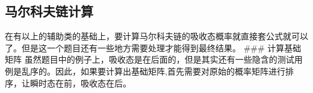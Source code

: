 \documentclass[12pt]{article}
\begin{document}
\subsection{马尔科夫链计算}\label{ux9a6cux5c14ux79d1ux592bux94feux8ba1ux7b97}

在有以上的辅助类的基础上，要计算马尔科夫链的吸收态概率就直接套公式就可以了。但是这一个题目还有一些地方需要处理才能得到最终结果。 \#\#\# 计算基础矩阵 虽然题目中的例子上，吸收态是在后面的，但是其实还有一些隐含的测试用例是乱序的。因此，如果要计算出基础矩阵,首先需要对原始的概率矩阵进行排序，让瞬时态在前，吸收态在后。

\begin{Shaded}
\begin{Highlighting}[]
  \OperatorTok{[]} \OperatorTok{(}\OperatorTok{[][]}\OperatorTok{)} \OperatorTok{\{}
    \OperatorTok{=}\OperatorTok{,}\OperatorTok{=} \OperatorTok{;}

    \OperatorTok{\textless{}}\OperatorTok{\textgreater{}}\OperatorTok{=}  \OperatorTok{\textless{}\textgreater{}();}
     \OperatorTok{(}\OperatorTok{=} \OperatorTok{;}\OperatorTok{\textless{}}\OperatorTok{;}\OperatorTok{++)} \OperatorTok{\{}
         \OperatorTok{(}\OperatorTok{(}\OperatorTok{[}\OperatorTok{])} \OperatorTok{==} \OperatorTok{)} \OperatorTok{\{}
\OperatorTok{(}\OperatorTok{);}
        \OperatorTok{\}}
    \OperatorTok{\}}
\OperatorTok{=}\OperatorTok{();}
    \OperatorTok{[][]}\OperatorTok{=}  \OperatorTok{[}\OperatorTok{][}\OperatorTok{];}


\end{Highlighting}
\end{Shaded}
\end{document}

